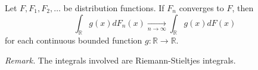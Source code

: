 \documentclass[12pt]{article}
\begin{document}
Let $F,F_1,F_2,\dots$ be distribution functions. If $F_n$ converges  to $F$, then
\[\int_\mathbb{R} g(x)dF_n(x) \xrightarrow[n\rightarrow\infty]{}
\int_\mathbb{R} g(x)dF(x)\]
for each continuous bounded function $g:\mathbb{R}\rightarrow\mathbb{R}$.

\emph{Remark.} The integrals involved are Riemann-Stieltjes integrals.
\end{document}
